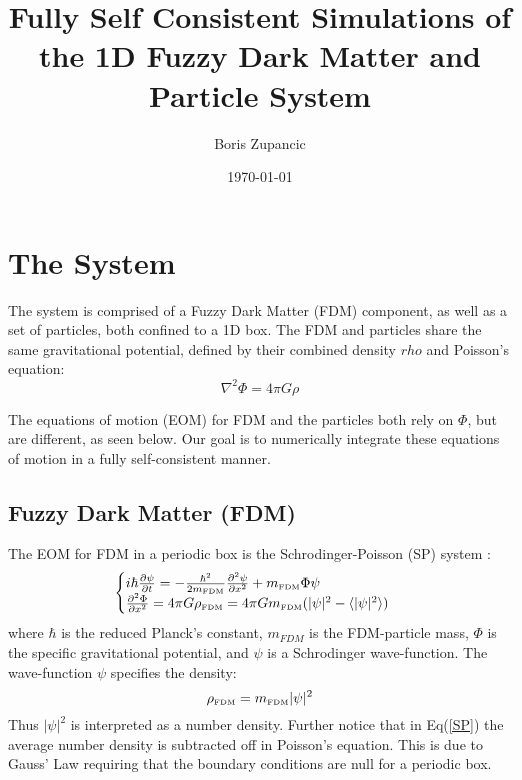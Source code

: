 \documentclass{book}
\title{Fully Self Consistent Simulations of the 1D Fuzzy Dark Matter and Particle System}
\author{Boris Zupancic}
\date{\today}
\newcommand{\pd}{\partial}
\begin{document}
\maketitle

\tableofcontents

\chapter{The System}

The system is comprised of a Fuzzy Dark Matter (FDM) component, as well as a set of particles, both confined to a 1D box. The FDM and particles share the same gravitational potential, defined by their combined density $rho$ and Poisson's equation: 
\begin{equation*}
\nabla^2 \Phi = 4\pi G \rho    
\end{equation*}

The equations of motion (EOM) for FDM and the particles both rely on $\Phi$, but are different, as seen below. Our goal is to numerically integrate these equations of motion in a fully self-consistent manner.

\section{Fuzzy Dark Matter (FDM)}
The EOM for FDM in a periodic box is the Schrodinger-Poisson (SP) system :
\begin{equation}
    \begin{cases}
    i\hbar \frac{\pd \psi}{\pd t} = -\frac{\hbar^2}{2 m_\text{\tiny{FDM}}} \frac{\pd^2 \psi}{\pd x^2} + m_\text{\tiny{FDM}} \Phi \psi 
    \\
    \frac{\pd^2 \Phi}{\pd x^2} = 4\pi G \rho_\text{\tiny{FDM}}= 4\pi G m_\text{\tiny{FDM}} (|\psi|^2 - \langle |\psi|^2 \rangle)
    \end{cases}
    \label{SP}
\end{equation}
where $\hbar$ is the reduced Planck's constant, $m_{FDM}$ is the FDM-particle mass, $\Phi$ is the specific gravitational potential, and $\psi$ is a Schrodinger wave-function. The wave-function $\psi$ specifies the density:
$$\rho_\text{\tiny{FDM}} = m_\text{\tiny{FDM}}|\psi|^2$$
Thus $|\psi|^2$ is interpreted as a number density. Further notice that in Eq(\ref{SP}) the average number density is subtracted off in Poisson's equation. This is due to Gauss' Law requiring that the boundary conditions are null for a periodic box. 
\end{document}
